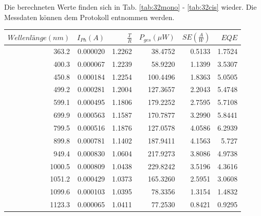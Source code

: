 Die berechneten Werte finden sich in Tab. \ref{tab:32mono} - \ref{tab:32cis} wieder. Die Messdaten können dem Protokoll entnommen werden.
\\

\begin{center}
\begin{tabular}{rrrrrr}
    $Wellenlänge (nm)$ &  $I_{Ph} (A)$ &    $\frac{T}{R}$ &  $P_{ges} (\mu W)$ &  $SE (\frac{A}{W})$ &       $EQE$ \\
    \hline
    363.2 &  0.000020 &  1.2262 &   38.4752 &  0.5133 &   1.7524 \\
    400.3 &  0.000067 &  1.2239 &   58.9220 &  1.1399 &   3.5307 \\
    450.8 &  0.000184 &  1.2254 &  100.4496 &  1.8363 &   5.0505 \\
    499.2 &  0.000281 &  1.2004 &  127.3657 &  2.2043 &   5.4748 \\
    599.1 &  0.000495 &  1.1806 &  179.2252 &  2.7595 &   5.7108 \\
    699.9 &  0.000563 &  1.1587 &  170.7877 &  3.2990 &   5.8441 \\
    799.5 &  0.000516 &  1.1876 &  127.0578 &  4.0586 &   6.2939 \\
    899.8 &  0.000781 &  1.1402 &  187.9411 &  4.1563 &     5.727 \\
    949.4 &  0.000830 &  1.0604 &  217.9273 &  3.8086 &   4.9738 \\
    1000.5 &  0.000809 &  1.0438 &  229.8242 &  3.5196 &   4.3616 \\
    1051.2 &  0.000429 &  1.0373 &  165.3260 &  2.5951 &   3.0608 \\
    1099.6 &  0.000103 &  1.0395 &   78.3356 &  1.3154 &    1.4832 \\
    1123.3 &  0.000065 &  1.0411 &   77.2530 &  0.8421 &  0.9295 \\
\end{tabular}
\label{tab:32mono}
\end{center}

